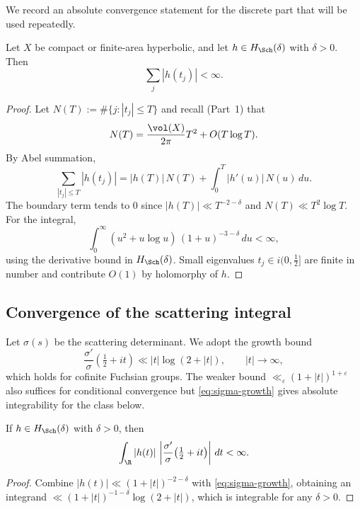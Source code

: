 We record an absolute convergence statement for the discrete part that will be used repeatedly.

\begin{theorem}
\label{thm:absolute-sum}
Let $X$ be compact or finite-area hyperbolic, and let $h\in H_{\Sch}(\delta)$ with $\delta>0$. Then
\[
  \sum_j |h(t_j)| < \infty.
\]
\end{theorem}

\begin{proof}
Let $N(T):=\#\{j:|t_j|\le T\}$ and recall (Part~1) that
\[
  N(T)=\frac{\vol(X)}{2\pi}T^2 + O(T\log T).
\]
By Abel summation,
\[
  \sum_{|t_j|\le T} |h(t_j)|
  = |h(T)|\,N(T) + \int_0^T |h'(u)|\,N(u)\,du.
\]
The boundary term tends to $0$ since $|h(T)|\ll T^{-2-\delta}$ and $N(T)\ll T^2\log T$. For the integral,
\[
  \int_0^\infty (u^2+u\log u)\,(1+u)^{-3-\delta}\,du < \infty,
\]
using the derivative bound in $H_{\Sch}(\delta)$. Small eigenvalues $t_j\in i(0,\tfrac12]$ are finite in number and contribute $O(1)$ by holomorphy of $h$.
\end{proof}

\subsection{Convergence of the scattering integral}
\label{subsec:scattering-integral-conv}

Let $\sigma(s)$ be the scattering determinant. We adopt the growth bound
\begin{equation}
\label{eq:sigma-growth}
  \frac{\sigma'}{\sigma}\!\left(\tfrac12+it\right) \ll |t|\log(2+|t|),\qquad |t|\to\infty,
\end{equation}
which holds for cofinite Fuchsian groups. The weaker bound $\ll_\varepsilon (1+|t|)^{1+\varepsilon}$ also suffices for conditional convergence but \eqref{eq:sigma-growth} gives absolute integrability for the class below.

\begin{proposition}
\label{prop:abs-int-scattering}
If $h\in H_{\Sch}(\delta)$ with $\delta>0$, then
\[
  \int_{\R} |h(t)|\,\left|\frac{\sigma'}{\sigma}\!\left(\tfrac12+it\right)\right|\,dt < \infty.
\]
\end{proposition}

\begin{proof}
Combine $|h(t)|\ll (1+|t|)^{-2-\delta}$ with \eqref{eq:sigma-growth}, obtaining an integrand $\ll (1+|t|)^{-1-\delta}\log(2+|t|)$, which is integrable for any $\delta>0$.
\end{proof}

